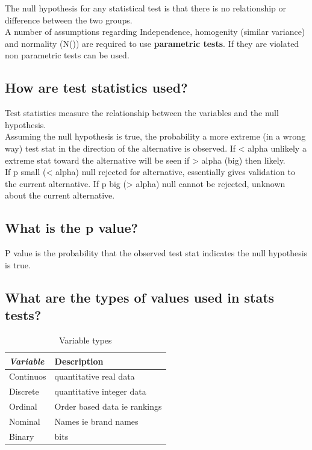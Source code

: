 \documentclass[11pt]{scrartcl} %
\begin{document}
The null hypothesis for any statistical test is that there is no relationship or difference between the two groups.\\

A number of assumptions regarding Independence, homogenity (similar variance) and normality (N()) are required to use
\textbf{parametric tests}. If they are violated non parametric tests can be used.

\subsection{How are test statistics used?}

Test statistics measure the relationship between the variables and the null hypothesis.\\

Assuming the null hypothesis is true, the probability a more extreme (in a wrong way) test stat in the direction of the
alternative is observed. If < alpha unlikely a extreme stat toward the alternative will be seen if > alpha (big)
then likely.\\

If p small (< alpha) null rejected for alternative, essentially gives validation to the current alternative.
If p big (> alpha) null cannot be rejected, unknown about the current alternative.

\subsection{What is the p value?}

P value is the probability that the observed test stat indicates the null hypothesis is true.

\subsection{What are the types of values used in stats tests?}

\begin{table}[h] %
	\centering %
	\begin{tabular}{l l}
		\toprule
		\textit{Variable} & \textbf{Description} \\
		\midrule
		Continuos & quantitative real data\\
		Discrete & quantitative integer data\\
		Ordinal & Order based data ie rankings\\
		Nominal & Names ie brand names \\
		Binary & bits \\
		\bottomrule
	\end{tabular}
	\caption{Variable types}
\end{table}
\end{document}
